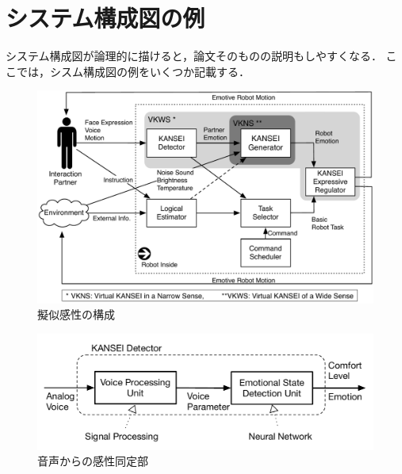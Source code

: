 \documentclass[a4paper,11pt,oneside,openany]{jsbook}
\begin{document}
\chapter{システム構成図の例}
システム構成図が論理的に描けると，論文そのものの説明もしやすくなる．
ここでは，シスム構成図の例をいくつか記載する．
\begin{figure}[h]
  \centering
  \includegraphics[width=12cm]{VKall.pdf}
  \vspace{-1mm}
  \caption{擬似感性の構成}
  \label{fig:vkall}
  \vspace{5mm}
\end{figure}

\begin{figure}[h]
  \centering
  \includegraphics[width=14cm]{VoiceKANSEIDetector.pdf}
  \vspace{-1mm}
  \caption{音声からの感性同定部}
  \label{fig:VoiceKANSEIDetector}
  \vspace{5mm}
\end{figure}
%
\end{document}

